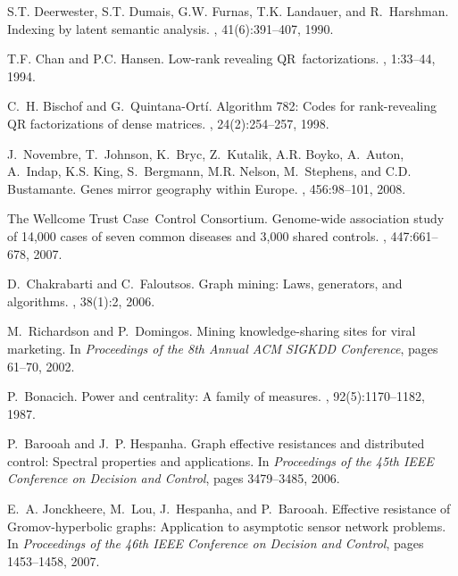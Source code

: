 \documentclass[twoside]{article}
\begin{document}
\begin{small}
\begin{thebibliography}{100}
S.T. Deerwester, S.T. Dumais, G.W. Furnas, T.K. Landauer, and R.~Harshman.
\newblock Indexing by latent semantic analysis.
,
  41(6):391--407, 1990.

T.F. Chan and P.C. Hansen.
\newblock Low-rank revealing {QR}~factorizations.
, 1:33--44, 1994.

C.~H. Bischof and G.~Quintana-Ort{\'i}.
\newblock Algorithm 782: {C}odes for rank-revealing {QR} factorizations of
  dense matrices.
, 24(2):254--257,
  1998.

J.~Novembre, T.~Johnson, K.~Bryc, Z.~Kutalik, A.R. Boyko, A.~Auton, A.~Indap,
  K.S. King, S.~Bergmann, M.R. Nelson, M.~Stephens, and C.D. Bustamante.
\newblock Genes mirror geography within {E}urope.
, 456:98--101, 2008.

The Wellcome Trust Case~Control Consortium.
\newblock Genome-wide association study of 14,000 cases of seven common
  diseases and 3,000 shared controls.
, 447:661--678, 2007.

D.~Chakrabarti and C.~Faloutsos.
\newblock Graph mining: Laws, generators, and algorithms.
, 38(1):2, 2006.

M.~Richardson and P.~Domingos.
\newblock Mining knowledge-sharing sites for viral marketing.
\newblock In {\em Proceedings of the 8th Annual ACM SIGKDD Conference}, pages
  61--70, 2002.

P.~Bonacich.
\newblock Power and centrality: A family of measures.
, 92(5):1170--1182, 1987.

P.~Barooah and J.~P. Hespanha.
\newblock Graph effective resistances and distributed control: Spectral
  properties and applications.
\newblock In {\em Proceedings of the 45th IEEE Conference on Decision and
  Control}, pages 3479--3485, 2006.

E.~A. Jonckheere, M.~Lou, J.~Hespanha, and P.~Barooah.
\newblock Effective resistance of {G}romov-hyperbolic graphs: Application to
  asymptotic sensor network problems.
\newblock In {\em Proceedings of the 46th IEEE Conference on Decision and
  Control}, pages 1453--1458, 2007.


\end{thebibliography}
\end{small}
\end{document}
